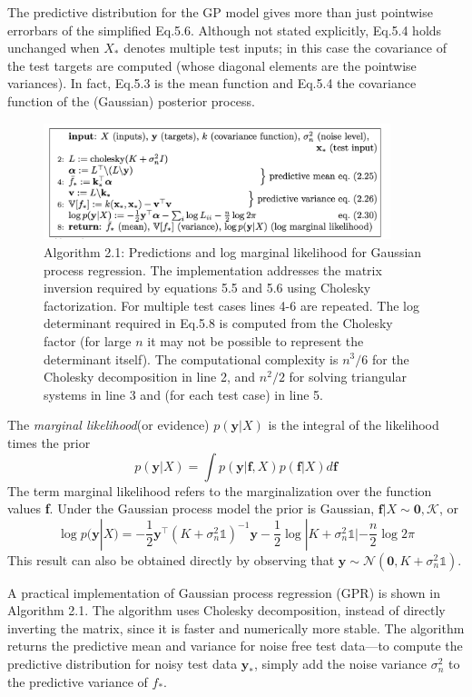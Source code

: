 \documentclass[twoside]{article}
\begin{document}
The predictive distribution for the GP model gives more than just pointwise errorbars of the simplified Eq.5.6. Although not stated explicitly, Eq.5.4 holds unchanged when $X_*$ denotes multiple test inputs; in this case the covariance of the test targets are computed (whose diagonal elements are the pointwise variances). In fact, Eq.5.3 is the mean function and Eq.5.4 the covariance function of the (Gaussian) posterior process.
\newpage
\begin{figure}[ht]
\caption{Algorithm 2.1: Predictions and log marginal likelihood for Gaussian process regression. The implementation addresses the matrix inversion required by equations 5.5 and 5.6 using Cholesky factorization. For multiple test cases lines 4-6 are repeated. The log determinant required in Eq.5.8 is computed from the Cholesky factor (for large $n$ it may not be possible to represent the determinant itself). The computational complexity is $n^3/6$ for the Cholesky decomposition in line 2, and $n^2/2$ for solving triangular systems in line 3 and (for each test case) in line 5.}
\centering
\includegraphics[width=0.90\textwidth]{img/algo_gp.png}
\end{figure}
The \textit{marginal likelihood}(or evidence) $p(\boldsymbol{y}|X)$ is the integral of the likelihood times the prior
\begin{equation*}
    p(\boldsymbol{y}|X) = \int p(\boldsymbol{y}|\textbf{f},X)p(\textbf{f}|X)d\textbf{f}
\end{equation*}
The term marginal likelihood refers to the marginalization over the function values \textbf{f}. Under the Gaussian process model the prior is Gaussian, $\textbf{f}|X \sim \mathcal{\boldsymbol{0}, K}$, or
\begin{equation}
    \log p(\boldsymbol{y}|X) = -\frac{1}{2}\boldsymbol{y}^\intercal(K + \sigma^2_n\mathds{1})^{-1}\boldsymbol{y} -\frac{1}{2}\log|K + \sigma^2_n\mathds{1}| -\frac{n}{2}\log2\pi
\end{equation}
This result can also be obtained directly by observing that $\boldsymbol{y} \sim \mathcal{N}(\boldsymbol{0}, K + \sigma^2_n\mathds{1})$.\medskip

A practical implementation of Gaussian process regression (GPR) is shown in Algorithm 2.1. The algorithm uses Cholesky decomposition, instead of directly inverting the matrix, since it is faster and numerically more stable. The algorithm returns the predictive mean and variance for noise free test data—to compute the predictive distribution for noisy test data $\boldsymbol{y}_*$, simply add the noise variance $    \sigma^2_n$ to the predictive variance of $f_*$.
\end{document}
